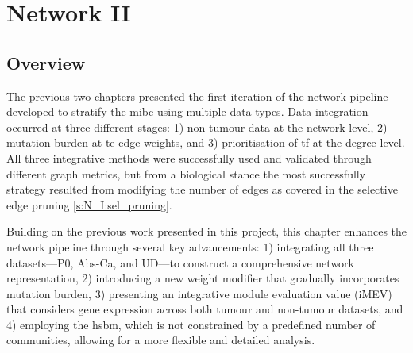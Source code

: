 
\chapter{Network II} \label{s:N_II}


\vspace{3mm}
\vspace{3mm}


\section{Overview}

The previous two chapters presented the first iteration of the network pipeline developed to stratify the \acrfull{mibc} using multiple data types. Data integration occurred at three different stages: 1) non-tumour data at the network level, 2) mutation burden at te edge weights, and 3) prioritisation of \acrfull{tf} at the degree level. All three integrative methods were successfully used and validated through different graph metrics, but from a biological stance the most successfully strategy resulted from modifying the number of edges as covered in the selective edge pruning \cref{s:N_I:sel_pruning}.


Building on the previous work presented in this project, this chapter enhances the network pipeline through several key advancements: 1) integrating all three datasets—P0, Abs-Ca, and UD—to construct a comprehensive network representation, 2) introducing a new weight modifier that gradually incorporates mutation burden, 3) presenting an integrative module evaluation value (iMEV) that considers gene expression across both tumour and non-tumour datasets, and 4) employing the \acrfull{hsbm}, which is not constrained by a predefined number of communities, allowing for a more flexible and detailed analysis.


